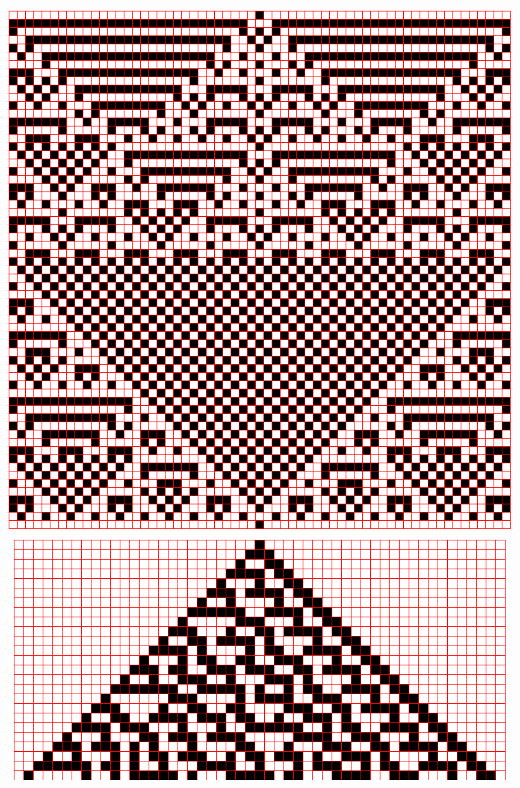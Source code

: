 \documentclass[11pt,class=report,crop=false]{standalone}
\begin{document}
\begin{activite}
\begin{enumerate}
\begin{center}
\includegraphics[scale=\myscale,scale=0.2]{ecran-automate-1}
\includegraphics[scale=\myscale,scale=0.2]{ecran-automate-6}
\end{center}	




\end{enumerate}



\end{activite}

\end{document}
